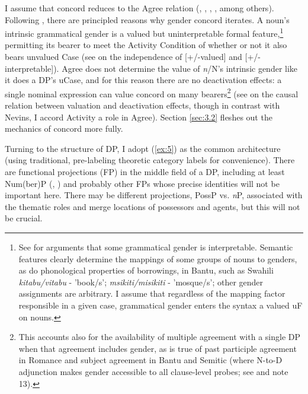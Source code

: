\documentclass[output=paper
,modfonts
,nonflat]{langsci/langscibook}
\begin{document}
I assume that concord reduces to the Agree relation (\citealt{Baker2008}, \citealt{Carstens2000}, \citealt{Danon2011}, \citealt{Koopman2006}, \citealt{Toosarvandani_Van_Urk2014} among others). Following \citet{Carstens2010, Carstens2011}, there are principled reasons why gender concord iterates. A noun's intrinsic grammatical gender is a valued but uninterpretable formal feature,\footnote{See \citet{Kramer2015} for arguments that some grammatical gender is interpretable. Semantic features clearly determine the mappings of some groups of nouns to genders, as do phonological properties of borrowings, in Bantu, such as Swahili \textit{kitabu/vitabu} - 'book/s'; \textit{msikiti/misikiti} - 'mosque/s'; other gender assignments are arbitrary. I assume that regardless of the mapping factor responsible in a given case, grammatical gender enters the syntax a valued uF on nouns.} permitting its bearer to meet the Activity Condition of \citet{Chomsky2001} whether or not it also bears unvalued Case (see \citealt{Pesetsky_Torrego2007} on the independence of [+/-valued] and [+/-interpretable]). Agree does not determine the value of \textit{n}/N’s intrinsic gender like it does a DP's uCase, and for this reason there are no {\textquotedbl}deactivation{\textquotedbl} effects: a single nominal expression can value concord on many bearers\footnote{\label{fn:6}This accounts also for the availability of multiple agreement with a single DP when that agreement includes gender, as is true of past participle agreement in Romance and subject agreement in Bantu and Semitic (where N-to-D adjunction makes gender accessible to all clause-level probes; see \citealt{Carstens2011} and note 13).} (see \citealt{Nevins2005} on the causal relation between valuation and deactivation effects, though in contrast with Nevins, I accord Activity a role in Agree). Section \ref{sec:3.2} fleshes out the mechanics of concord more fully.

Turning to the structure of DP, I adopt (\ref{ex:5}) as the common architecture (using traditional, pre-labeling theoretic category labels for convenience). There are functional projections (FP) in the middle field of a DP, including at least Num(ber)P (\citealt{Carstens1991}, \citealt{Ritter1991, Ritter1992}) and probably other FPs whose precise identities will not be important here. There may be different projections, PossP vs. \textit{n}P, associated with the thematic roles and merge locations of possessors and agents, but this will not be crucial.
\end{document}
